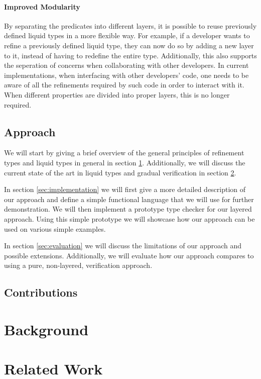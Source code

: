 \documentclass[acmsmall, review, screen]{acmart}
\begin{document}
\paragraph{Improved Modularity}

By separating the predicates into different layers, it is possible to reuse previously defined liquid types in a more flexible way. For example, if a developer wants to refine a previously defined liquid type, they can now do so by adding a new layer to it, instead of having to redefine the entire type. Additionally, this also supports the seperation of concerns when collaborating with other developers. In current implementations, when interfacing with other developers' code, one needs to be aware of all the refinements required by such code in order to interact with it. When different properties are divided into proper layers, this is no longer required.

\subsection{Approach}
We will start by giving a brief overview of the general principles of refinement types and liquid types in general in section \ref{sec:background}. Additionally, we will discuss the current state of the art in liquid types and gradual verification in section \ref{sec:related}. 

In section \ref{sec:implementation} we will first give a more detailed description of our approach and define a simple functional language that we will use for further demonstration. We will then implement a prototype type checker for our layered approach. Using this simple prototype we will showcase how our approach can be used on various simple examples.

In section \ref{sec:evaluation} we will discuss the limitations of our approach and possible extensions. Additionally, we will evaluate how our approach compares to using a pure, non-layered, verification approach.

\subsection{Contributions}
\section{Background}
\label{sec:background}
\section{Related Work}
\label{sec:related}
\end{document}
